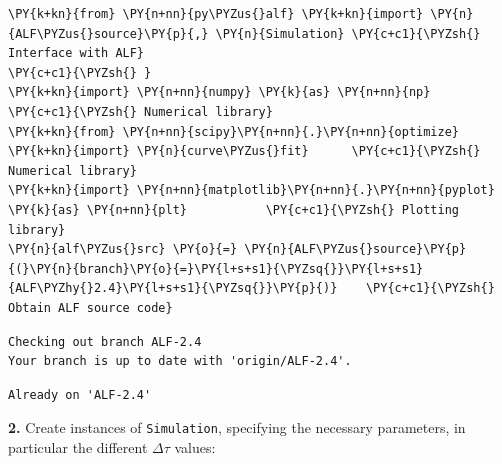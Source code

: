     \begin{tcolorbox}[breakable, size=fbox, boxrule=1pt, pad at break*=1mm,colback=cellbackground, colframe=cellborder]
\begin{Verbatim}[commandchars=\\\{\}]
\PY{k+kn}{from} \PY{n+nn}{py\PYZus{}alf} \PY{k+kn}{import} \PY{n}{ALF\PYZus{}source}\PY{p}{,} \PY{n}{Simulation} \PY{c+c1}{\PYZsh{} Interface with ALF}
\PY{c+c1}{\PYZsh{} }
\PY{k+kn}{import} \PY{n+nn}{numpy} \PY{k}{as} \PY{n+nn}{np}                        \PY{c+c1}{\PYZsh{} Numerical library}
\PY{k+kn}{from} \PY{n+nn}{scipy}\PY{n+nn}{.}\PY{n+nn}{optimize} \PY{k+kn}{import} \PY{n}{curve\PYZus{}fit}      \PY{c+c1}{\PYZsh{} Numerical library}
\PY{k+kn}{import} \PY{n+nn}{matplotlib}\PY{n+nn}{.}\PY{n+nn}{pyplot} \PY{k}{as} \PY{n+nn}{plt}           \PY{c+c1}{\PYZsh{} Plotting library}
\PY{n}{alf\PYZus{}src} \PY{o}{=} \PY{n}{ALF\PYZus{}source}\PY{p}{(}\PY{n}{branch}\PY{o}{=}\PY{l+s+s1}{\PYZsq{}}\PY{l+s+s1}{ALF\PYZhy{}2.4}\PY{l+s+s1}{\PYZsq{}}\PY{p}{)}    \PY{c+c1}{\PYZsh{} Obtain ALF source code}
\end{Verbatim}
\end{tcolorbox}

    \begin{Verbatim}[commandchars=\\\{\}]
Checking out branch ALF-2.4
Your branch is up to date with 'origin/ALF-2.4'.
    \end{Verbatim}

    \begin{Verbatim}[commandchars=\\\{\}]
Already on 'ALF-2.4'
    \end{Verbatim}

    \textbf{2.} Create instances of \texttt{Simulation}, specifying the
necessary parameters, in particular the different \(\Delta \tau\)
values:

